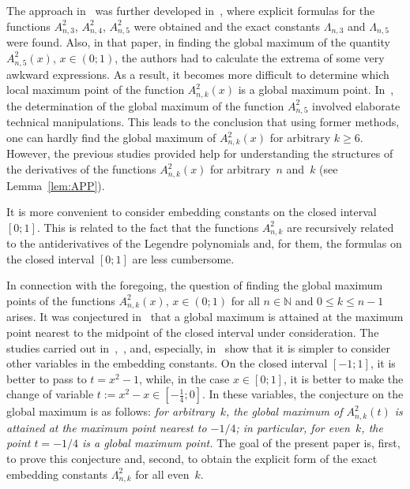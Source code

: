 \documentclass[12pt,oneside]{amsproc}
\numberwithin{equation}{section}
\begin{document}
 The approach in~\cite{Kalyab}
was further developed in~\cite{GarmSh},
where explicit formulas for the functions
$A^2_{n,3}$, $A^2_{n,4}$, $A^2_{n,5}$
were obtained
and the exact constants
$\Lambda_{n,3}$
and
$\Lambda_{n,5}$
were found.
 Also,
in that paper,
in finding the global maximum of the quantity
$A^2_{n,5}(x)$, $x\in(0;1)$,
the authors had to calculate the extrema of some very
awkward expressions.
 As a result, it becomes more difficult
to determine which local maximum point of the function
$A^2_{n,k}(x)$
is a global maximum point.
 In~\cite{GarmSh}, the determination of the global maximum of the function
$A^2_{n,5}$
involved elaborate technical manipulations.
 This leads to the conclusion
that using former methods, one can hardly find the global maximum of
$A^2_{n,k}(x)$
for
arbitrary
$k\geqslant 6$.
 However, the previous studies provided help
for understanding the structures of the derivatives of the functions
$A^2_{n,k}(x)$
for arbitrary~$n$ and~$k$
(see Lemma~\ref{lem:APP}).

 It is more convenient
to consider embedding constants
on the closed interval
$[0;1]$.
 This is related to the fact that the functions
$A^2_{n,k}$
are recursively related to the antiderivatives of the Legendre polynomials
and, for them, the formulas
on the closed interval
$[0;1]$
are less cumbersome.

 In connection with the foregoing,
the question of finding the global maximum points of the functions
$A^2_{n,k}(x)$, $x\in(0;1)$
for all
$n\in \mathbb{N}$
and
$0\leqslant k\leqslant n-1$
arises.
 It was conjectured in~\cite{GarmSh} that a global maximum
is attained at the maximum point
nearest to the midpoint of the closed interval under consideration.
 The studies carried out in~\cite{Kalyab},~\cite{NazM},
and, especially, in~\cite{GarmSh} show that
it is simpler to consider other variables in the embedding constants.
 On the closed interval
$[-1;1]$, it is better to pass to $t=x^2-1$, while,
in the case
$x\in[0;1]$,
it is better to make the change of variable
$t:=x^2-x\in[-\frac14;0]$.
 In these variables,
the conjecture on the global maximum
is as follows:
\textit{for arbitrary~$k$,
the global maximum of
$A^2_{n,k}(t)$
is attained
at the maximum point nearest to
$-1/4$\textup;
in particular,
for even~$k$,
the point
$t=-1/4$
is a global maximum point.}
 The goal of the present paper
is, first, to prove this conjecture
and, second, to obtain the explicit form of the exact embedding constants
$\Lambda^2_{n,k}$
for all even~$k$.
\end{document}
